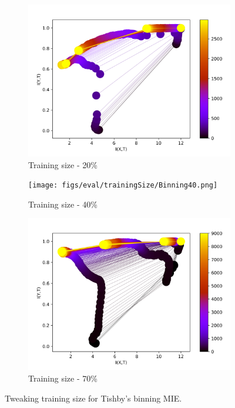 \documentclass[dissertation.tex]{subfiles}
\begin{document}
\begin{figure}[ht]
  \centering
  \begin{subfigure}[t]{0.32\textwidth}
    \centering
    \includegraphics[width=\textwidth]{figs/eval/trainingSize/Binning20.png}
    \caption{
      Training size - 20\%
    }
    \label{figBinningTS20}
  \end{subfigure}
  \begin{subfigure}[t]{0.32\textwidth}
    \centering
    \texttt{[image: figs/eval/trainingSize/Binning40.png]}
    \caption{
      Training size - 40\%
    }
    \label{figBinningTS40}
  \end{subfigure}
  \begin{subfigure}[t]{0.32\textwidth}
    \centering
    \includegraphics[width=\textwidth]{figs/eval/trainingSize/Binning70.png}
    \caption{
      Training size - 70\%
    }
    \label{figBinningTS70}
  \end{subfigure}
  \caption{
      Tweaking training size for Tishby's binning MIE.
    }
  \label{figTS}
\end{figure}
\end{document}
